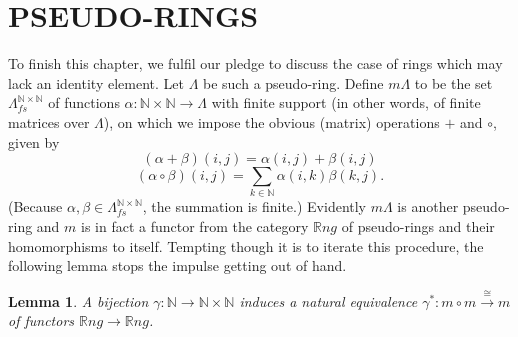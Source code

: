 \documentclass[openany,leqno]{book}  %
\newcommand{\N}{\mathbb{N}}
\newcommand{\iso}{\overset{\cong}{\to}} %
\newtheorem{lemma}[theorem]{Lemma}
\begin{document}
\section*{PSEUDO-RINGS}

To finish this chapter, we fulfil our pledge to discuss the case of rings which may lack an
 identity element. Let $\Lambda$ be such a pseudo-ring. Define $m\Lambda$ to be the set $\Lambda_{fs}^{\N\times \N}$ of functions
$\alpha\colon  \N\times \N\longrightarrow \Lambda$ with finite support (in other words, of finite matrices over $\Lambda$), on which we impose the obvious (matrix) operations $+$ and $\circ$, given by
\[(\alpha+\beta)(i,j)=\alpha(i,j)+\beta(i,j)\]
\[(\alpha \circ \beta)(i,j)=\sum_{k\in \N} \alpha(i,k)\beta(k,j).\]
(Because $\alpha,\beta\in \Lambda_{fs}^{\N\times \N}$, the summation is finite.) Evidently $m\Lambda$ is another pseudo-ring and $m$ is in fact a functor from the category $\mathbb{R}ng$ of pseudo-rings and their homomorphisms to itself.
Tempting though it is to iterate this procedure, the following lemma stops the impulse getting out of hand.
\begin{lemma}
A bijection $\gamma\colon  \N\longrightarrow \N\times \N$ induces a natural equivalence $\gamma^*\colon  m\circ m\iso m$ of functors $\mathbb{R}ng\longrightarrow \mathbb{R}ng$.
\end{lemma}
\end{document}
